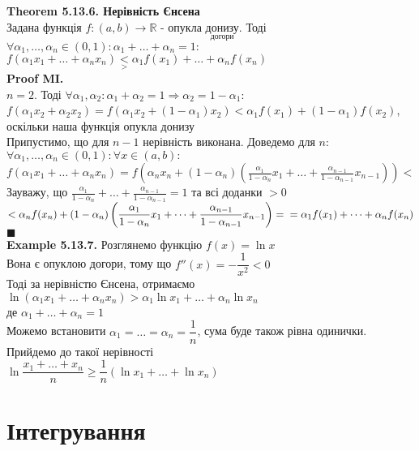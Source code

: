 \documentclass[a4paper, 14pt]{extarticle}
\def\huge{\displaystyle}
\def\bigline{\vspace{5mm}\\}
\def\ex#1{\textbf{Example {#1}}}
\def\th#1{\textbf{Theorem {#1}}}
\def\proofMI{\textbf{Proof MI.}\\}
\def\bigline{\vspace{5mm}\\}
\def\qed{$\blacksquare$}
\begin{document}
\th{5.13.6. Нерівність Єнсена}\\
Задана функція $f:(a,b) \to \mathbb{R}$ - опукла $\underset{\textrm{догори}}{\textrm{донизу}}$. Тоді\\
$\forall \alpha_1, \dots, \alpha_n \in (0,1): \huge \alpha_1 + \dots + \alpha_n = 1:$\\
$\huge f(\alpha_1 x_1 + \dots + \alpha_n x_n) \underset{>}{<} \alpha_1 f(x_1) + \dots + \alpha_n f(x_n)$\\
\proofMI
$n = 2$. Тоді $\forall \alpha_1, \alpha_2: \alpha_1 + \alpha_2 = 1 \Rightarrow \alpha_2 = 1- \alpha_1:$\\
$f(\alpha_1 x_2 + \alpha_2 x_2) = f(\alpha_1 x_2 + (1-\alpha_1)x_2) < \alpha_1 f(x_1) + (1-\alpha_1)f(x_2)$, оскільки наша функція опукла донизу\\
Припустимо, що для $n-1$ нерівність виконана. Доведемо для $n$:\\
$\forall \alpha_1,\dots,\alpha_n \in (0,1): \forall x \in (a,b):$\\
$f(\alpha_1 x_1 + \dots + \alpha_n x_n) = \huge f\left(\alpha_n x_n + (1-\alpha_n)\left(\frac{\alpha_1}{1-\alpha_n}x_1 + \dots + \frac{\alpha_{n-1}}{1-\alpha_{n-1}}x_{n-1} \right)\right) <$\\
Зауважу, що $\huge \frac{\alpha_1}{1-\alpha_n} + \dots + \frac{\alpha_{n-1}}{1-\alpha_{n-1}} = 1$ та всі доданки $>0$\\
$< \huge \alpha_n f(x_n) + (1-\alpha_n)\left(\frac{\alpha_1}{1-\alpha_n}x_1 + \dots + \frac{\alpha_{n-1}}{1-\alpha_{n-1}}x_{n-1} \right) = \\ = \alpha_1 f(x_1) + \dots + \alpha_n f(x_n)$ \qed
\bigline
\ex{5.13.7.} Розглянемо функцію $f(x) = \ln x$\\
Вона є опуклою догори, тому що $f''(x) = -\dfrac{1}{x^2} < 0$\\
Тоді за нерівністю Єнсена, отримаємо\\
$\ln(\alpha_1 x_1 + \dots + \alpha_n x_n) > \alpha_1 \ln x_1 + \dots + \alpha_n \ln x_n$\\
де $\alpha_1 + \dots + \alpha_n = 1$\\
Можемо встановити $\alpha_1 = \dots = \alpha_n = \dfrac{1}{n}$, сума буде також рівна одинички. Прийдемо до такої нерівності\\
$\ln \dfrac{x_1+\dots+x_n}{n} \geq \dfrac{1}{n} \left( \ln x_1 + \dots + \ln x_n \right)$
\bigline

\newpage
\section{Інтегрування}
\end{document}
